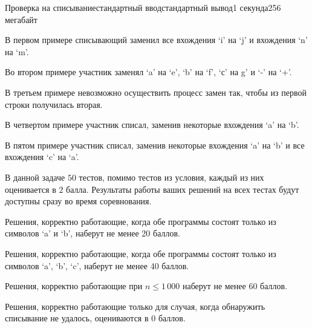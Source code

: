 \begin{problem}{Проверка на списывание}{стандартный ввод}{стандартный вывод}{1 секунда}{256 мегабайт}
\Examples

\begin{example}
%
%
%
%
%
%
\end{example}

\Note
В первом примере списывающий заменил все вхождения `i' на `j' и вхождения `n' на `m'. 

Во втором примере участник заменял `a' на `e', `b' на `f', `с' на g' и `-' на `+'. 

В третьем примере невозможно осуществить процесс замен так, чтобы из первой строки получилась вторая. 

В четвертом примере участник списал, заменив некоторые вхождения `a' на `b'. 

В пятом примере участник списал, заменив некоторые вхождения `a' на `b' и все вхождения `c' на `a'.

\Scoring
В данной задаче $50$ тестов, помимо тестов из условия, каждый из них оценивается в $2$ балла. Результаты работы ваших решений на всех тестах будут доступны сразу во время соревнования. 

Решения, корректно работающие, когда обе программы состоят только из символов `a' и `b', наберут не менее 20 баллов.

Решения, корректно работающие, когда обе программы состоят только из символов `a', `b', `c', наберут не менее 40 баллов.

Решения, корректно работающие при $n \leqslant 1\,000$ наберут не менее 60 баллов.

Решения, корректно работающие только для случая, когда обнаружить списывание не удалось, оцениваются в 0 баллов.




\end{problem}

